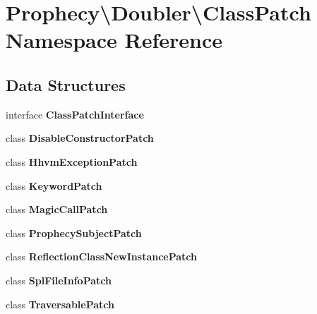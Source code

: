 \section{Prophecy\textbackslash{}Doubler\textbackslash{}Class\+Patch Namespace Reference}
\label{namespace_prophecy_1_1_doubler_1_1_class_patch}
\subsection*{Data Structures}
\begin{DoxyCompactItemize}
\item 
interface {\bf Class\+Patch\+Interface}
\item 
class {\bf Disable\+Constructor\+Patch}
\item 
class {\bf Hhvm\+Exception\+Patch}
\item 
class {\bf Keyword\+Patch}
\item 
class {\bf Magic\+Call\+Patch}
\item 
class {\bf Prophecy\+Subject\+Patch}
\item 
class {\bf Reflection\+Class\+New\+Instance\+Patch}
\item 
class {\bf Spl\+File\+Info\+Patch}
\item 
class {\bf Traversable\+Patch}
\end{DoxyCompactItemize}

